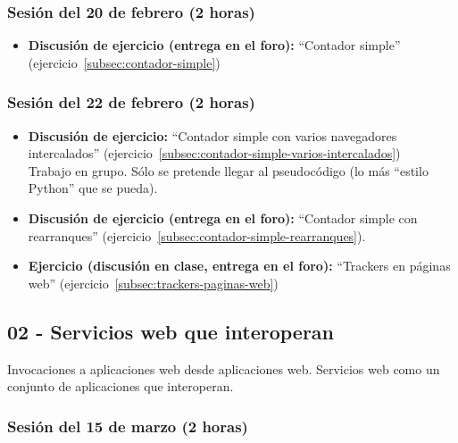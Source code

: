 \documentclass[a4paper,12pt]{article}
\begin{document}
\subsubsection{Sesión del 20 de febrero (2 horas)}

\begin{itemize}
\item \textbf{Discusión de ejercicio (entrega en el foro):} ``Contador simple'' (ejercicio~\ref{subsec:contador-simple})
\end{itemize}

\subsubsection{Sesión del 22 de febrero (2 horas)}

\begin{itemize}
\item \textbf{Discusión de ejercicio:} ``Contador simple con varios 
navegadores intercalados'' (ejercicio~\ref{subsec:contador-simple-varios-intercalados}) \\
  Trabajo en grupo. Sólo se pretende llegar al pseudocódigo (lo más ``estilo Python'' que se pueda).
\item \textbf{Discusión de ejercicio (entrega en el foro):} ``Contador simple con rearranques'' (ejercicio~\ref{subsec:contador-simple-rearranques}).
\item \textbf{Ejercicio (discusión en clase, entrega en el foro):} ``Trackers en páginas web'' (ejercicio~\ref{subsec:trackers-paginas-web})
\end{itemize}


\subsection{02 - Servicios web que interoperan}

Invocaciones a aplicaciones web desde aplicaciones web. Servicios web como un conjunto de aplicaciones que interoperan.


\subsubsection{Sesión del 15 de marzo (2 horas)}
\end{document}
